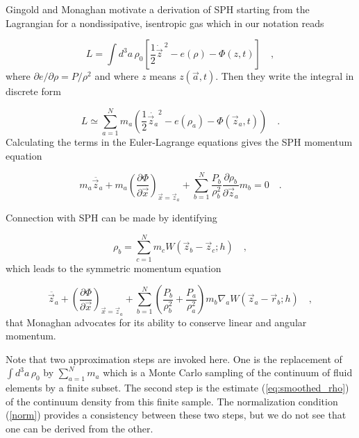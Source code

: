 \documentclass{article}
\def\a{{\vec a}}
\def\x{{\vec x}}
\def\z{{\vec z}}
\def\.{{\quad .}}
\def\_,{{\quad ,}}
\begin{document}
Gingold and Monaghan \cite{A:GM82} motivate a derivation of SPH starting from
the Lagrangian for a nondissipative, isentropic gas which in our notation reads

\begin{equation}
    L = \int\!\! d^3a\,\rho_0 \left[ \frac{1}{2} {\dot {\vec z}\,}^2 -
        e(\rho) - \Phi(z,t)\right] \_,
\end{equation}
%
where ${\partial e}/{\partial \rho} = {P}/{\rho^2}$ and where $z$ means
$z(\a,t)$.  Then they write the integral in discrete form

\begin{equation}
    L \simeq \sum_{a=1}^{N} m_a \left( \frac{1}{2} {\dot {\vec z_a}}^2 -
    e(\rho_a)  - \Phi(\vec z_a, t) \right) \.
\end{equation}
%
Calculating the terms in the Euler-Lagrange equations gives the SPH
momentum equation

\begin{equation}
    m_a \ddot {\vec z_a}  + m_a \left( \frac{\partial \Phi}{\partial
                                    \x} \right)_{\x = \z_a}
    + \sum_{b=1}^{N} \frac{P_b}{\rho_b^2}
    \frac{\partial \rho_b}{\partial {\vec z_a}} m_b
    = 0 \.
\end{equation}


Connection with SPH can be made by identifying

\begin{equation}\label{eq:smoothed_rho}
    \rho_b = \sum_{c=1}^{N} m_c W ( {\vec z_b} - {\vec z_c}; h ) \_,
\end{equation}
%
which leads to the symmetric momentum equation

\begin{equation}\label{eq:sym_sph}
    {\ddot {\vec z_a}}  + \left( \frac{\partial \Phi}{\partial
                                    \x} \right)_{\x = \z_a}
    + \sum_{b=1}^{N} \left( \frac{P_b}{\rho_b^2} +
    \frac{P_a}{\rho_a^2} \right) m_b \nabla_a W ( {\vec z_a} - {\vec
    r_b}; h ) \_,
\end{equation}
%
that Monaghan \cite{A:JJM92,A:GM82,A:PJM91} advocates for its ability to
conserve linear and angular momentum.

Note that two approximation steps are invoked here.  One is the replacement of
$\int\!\! d^3a\,\rho_0$ by $\sum_{a=1}^N m_a$ which is a Monte Carlo sampling
of the continuum of fluid elements by a finite subset.  The second step is the
estimate (\ref{eq:smoothed_rho}) of the continuum density from this finite
sample.  The normalization condition (\ref{norm}) provides a consistency
between these two steps, but we do not see that one can be derived from
the other.
\end{document}
